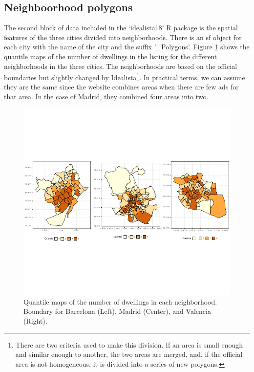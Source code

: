 \documentclass[Royal,times,sageh]{sagej}
\begin{document}
\hypertarget{neighboorhood-polygons}{%
\subsection{Neighboorhood polygons}\label{neighboorhood-polygons}}

The second block of data included in the `idealista18' R package is the
spatial features of the three cities divided into neighborhoods. There
is an sf object for each city with the name of the city and the suffix
'\_Polygons'. Figure \ref{fig:all-polygons} shows the quantile maps of
the number of dwellings in the listing for the different neighborhoods
in the three cities. The neighborhoods are based on the official
boundaries but slightly changed by
Idealista\footnote{There are two criteria used to make this division. If an area is small enough and similar enough to another, the two areas are merged, and, if the official area is not homogeneous, it is divided into a series of new polygons.}.
In practical terms, we can assume they are the same since the website
combines areas when there are few ads for that area. In the case of
Madrid, they combined four areas into two.

\begin{figure}
\centering
\includegraphics{main_EPB_files/figure-latex/unnamed-chunk-1-1.pdf}
\caption{\label{fig:all-polygons}Quantile maps of the number of
dwellings in each neighborhood. Boundary for Barcelona (Left), Madrid
(Center), and Valencia (Right).}
\end{figure}
\end{document}
